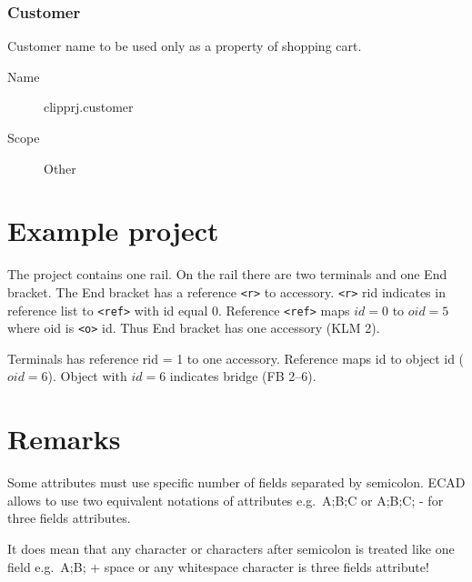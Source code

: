 \documentclass[%
	a4paper,
	oneside,
	listof=numbered,
	parskip=half,
	headsepline=true,
	footsepline=false,
	normalheadings,
	0.7headlines,
	headexclude,
	]{scrbook}
\begin{document}
\subsection{Customer}

Customer name to be used only as a property of shopping cart.

\begin{description}
	\item[Name] clipprj.customer
	\item[Scope] Other
\end{description}

\chapter{Example project}



The project contains one rail.
On the rail there are two terminals and one End bracket.
The End bracket has a reference \verb|<r>| to accessory.
\verb|<r>| rid indicates in reference list to \verb|<ref>| with id equal $0$.
Reference \verb|<ref>| maps $id=0$ to $oid=5$ where oid is \verb|<o>| id.
Thus End bracket has one accessory (KLM 2).

Terminals has reference rid = 1 to one accessory.
Reference maps id to object id ($oid=6$).
Object with $id=6$ indicates bridge (FB 2--6).

\chapter{Remarks}

Some attributes must use specific number of fields separated by semicolon. 
ECAD allows to use two equivalent notations of attributes e.g.\ A;B;C or A;B;C; - for three fields attributes.

It does mean that any character or characters after semicolon is treated like one field e.g.\ A;B; + \glqq{}space or any whitespace character\grqq{} is three fields attribute!

\listoffigures
\lstlistoflistings

%
%
\end{document}

